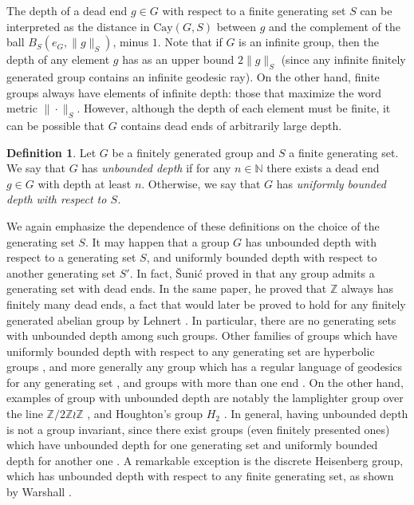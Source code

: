 \documentclass[reqno,oneside]{amsart}
\newcommand{\cay}[2]{\mathrm{Cay}(#1,#2)}
\newcommand{\Z}{\mathbb{Z}}
\theoremstyle{plain}
\theoremstyle{definition}
\newtheorem{defn}[thm]{Definition} %
\begin{document}
The depth of a dead end $g\in G$ with respect to a finite generating set $S$ can be interpreted as the distance in $\cay{G}{S}$ between $g$ and the complement of the ball $B_S(e_G,\|g\|_{S})$, minus $1$. Note that if $G$ is an infinite group, then the depth of any element $g$ has as an upper bound $2\|g\|_S$ (since any infinite finitely generated group contains an infinite geodesic ray). On the other hand, finite groups always have elements of infinite depth: those that maximize the word metric $\|\cdot \|_{S}$. However, although the depth of each element must be finite, it can be possible that $G$ contains dead ends of arbitrarily large depth.



\begin{defn}\label{def: unbounded depth} Let $G$ be a finitely generated group and $S$ a finite generating set. We say that $G$ has \textit{unbounded depth} if for any $n\in \mathbb{N}$ there exists a dead end $g\in G$ with depth at least $n$. Otherwise, we say that $G$ has \textit{uniformly bounded depth with respect to $S$.} 
\end{defn}

We again emphasize the dependence of these definitions on the choice of the generating set $S$. It may happen that a group $G$ has unbounded depth with respect to a generating set $S$, and uniformly bounded depth with respect to another generating set $S'$. In fact, \v{S}unić proved in \cite{vsunic2008frobenius} that any group admits a generating set with dead ends. In the same paper, he proved that $\Z$ always has finitely many dead ends, a fact that would later be proved to hold for any finitely generated abelian group by Lehnert \cite{lehnert2009some}. In particular, there are no generating sets with unbounded depth among such groups. Other families of groups which have uniformly bounded depth with respect to any generating set are hyperbolic groups \cite{Bogopolski97}, and more generally any group which has a regular language of geodesics for any generating set \cite{warshall2010deep}, and groups with more than one end \cite{lehnert2009some}. On the other hand, examples of group with unbounded depth are notably the lamplighter group over the line $\Z/2\Z\wr \Z$ \cite{CET2006,ClearyTaback05,ClearyTabackmetricproperties05}, and Houghton's group $H_2$ \cite{lehnert2009some}. In general, having unbounded depth is not a group invariant, since there exist groups (even finitely presented ones) which have unbounded depth for one generating set and uniformly bounded depth for another one \cite{riley2006unbounded,cleary2006finitely}. A remarkable exception is the discrete Heisenberg group, which has unbounded depth with respect to any finite generating set, as shown by Warshall \cite{warshall2010deep,warshall2011group}.
\end{document}
